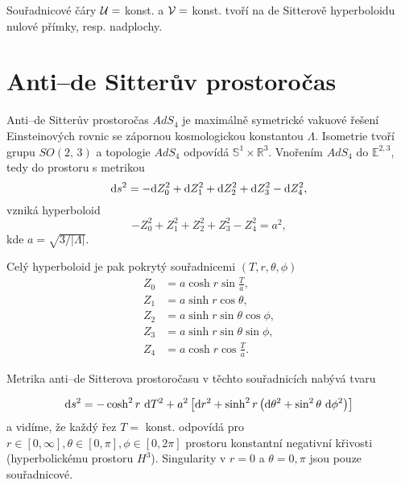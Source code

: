 Souřadnicové čáry $\mathcal{U} =$ konst. a $\mathcal{V} =$ konst. tvoří na de Sitterově hyperboloidu nulové
přímky, resp. nadplochy.

\section{Anti--de Sitterův prostoročas}

Anti--de Sitterův prostoročas $AdS_4$ je maximálně symetrické vakuové řešení Einsteinových rovnic se zápornou
kosmologickou konstantou $\Lambda$. Isometrie tvoří grupu $SO(2,\,3)$ a topologie $AdS_4$ odpovídá $\mathbb{S}^1 \times \mathbb{R}^3$.
Vnořením $AdS_4$ do $\mathbb{E}^{2,3}$, tedy do prostoru s metrikou
\begin{equation}
     \label{eq:AdS5DMetric}
     \mathrm{d} s^2 = -\mathrm{d} Z_0^2 + \mathrm{d} Z_1^2 + \mathrm{d} Z_2^2 + \mathrm{d} Z_3^2 - \mathrm{d} Z_4^2,
\end{equation}
vzniká hyperboloid
\begin{equation}
     \label{eq:AdS_hyperboloid}
     -Z_0^2 + Z_1^2 + Z_2^2 + Z_3^2 - Z_4^2 = a^2,
\end{equation}
kde $a = \sqrt{3/|\Lambda|}$.

Celý hyperboloid je pak pokrytý souřadnicemi $(T, r, \theta, \phi)$
\begin{equation}
     \begin{split}
          Z_0 &= a \cosh r \sin \frac{T}{a}, \\
          Z_1 &= a \sinh r \cos \theta, \\
          Z_2 &= a \sinh r \sin \theta \cos \phi, \\
          Z_3 &= a \sinh r \sin \theta \sin \phi, \\
          Z_4 &= a \cosh r \cos \frac{T}{a}.
     \end{split}
\end{equation}

Metrika anti--de Sitterova prostoročasu v těchto souřadnicích nabývá tvaru

\begin{equation}
     \mathrm{d} s^2 = - \cosh^2 r ~ \mathrm{d} T^2 + a^2 \left[ \mathrm{d} r^2 + \sinh^2 r \left( \mathrm{d} \theta^2 + \sin^2 \theta ~ \mathrm{d} \phi^2 \right) \right]
\end{equation}
a vidíme, že každý řez $T =$ konst. odpovídá pro $r\in\left[0, \infty\right], \theta \in \left[0, \pi\right], \phi \in \left[0, 2\pi\right]$
prostoru konstantní negativní křivosti (hyperbolickému prostoru $H^3$).
Singularity v $r = 0$ a $\theta = 0, \pi$ jsou pouze souřadnicové.

